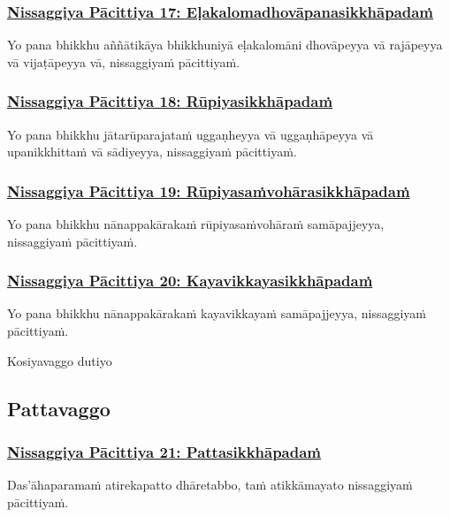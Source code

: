 \subsubsection*{\hyperref[forf-exp17]{Nissaggiya Pācittiya 17: Eḷakalomadhovāpanasikkhāpadaṁ}}
\label{np17}
Yo pana bhikkhu aññātikāya bhikkhuniyā eḷakalomāni dhovāpeyya vā rajāpeyya vā vijaṭāpeyya vā, nissaggiyaṁ pācittiyaṁ.

\subsubsection*{\hyperref[forf-exp18]{Nissaggiya Pācittiya 18: Rūpiyasikkhāpadaṁ}}
\label{np18}
Yo pana bhikkhu jātarūparajataṁ uggaṇheyya vā uggaṇhāpeyya vā upanikkhittaṁ vā sādiyeyya, nissaggiyaṁ pācittiyaṁ.

\subsubsection*{\hyperref[forf-exp19]{Nissaggiya Pācittiya 19: Rūpiyasaṁvohārasikkhāpadaṁ}}
\label{np19}
Yo pana bhikkhu nānappakārakaṁ rūpiyasaṁvohāraṁ samāpajjeyya, nissaggiyaṁ pācittiyaṁ.

\subsubsection*{\hyperref[forf-exp20]{Nissaggiya Pācittiya 20: Kayavikkayasikkhāpadaṁ}}
\label{np20}
Yo pana bhikkhu nānappakārakaṁ kayavikkayaṁ samāpajjeyya, nissaggiyaṁ pācittiyaṁ.

\begin{center}
  Kosiyavaggo dutiyo
\end{center}

\subsection{Pattavaggo}
\vspace{0.2cm}

\subsubsection*{\hyperref[forf-exp21]{Nissaggiya Pācittiya 21: Pattasikkhāpadaṁ}}
\label{np21}
Das'āhaparamaṁ atirekapatto dhāretabbo, taṁ atikkāmayato nissaggiyaṁ pācittiyaṁ.

